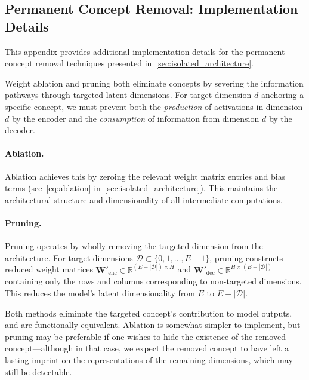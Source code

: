 \subsection{Permanent Concept Removal: Implementation Details}
\label{sec:permanent_removal_details}

This appendix provides additional implementation details for the permanent concept removal techniques presented in~\cref{sec:isolated_architecture}.

Weight ablation and pruning both eliminate concepts by severing the information pathways through targeted latent dimensions. For target dimension $d$ anchoring a specific concept, we must prevent both the \textit{production} of activations in dimension $d$ by the encoder and the \textit{consumption} of information from dimension $d$ by the decoder.

\paragraph{Ablation.}
Ablation achieves this by zeroing the relevant weight matrix entries and bias terms (see~\cref{eq:ablation} in~\cref{sec:isolated_architecture}). This maintains the architectural structure and dimensionality of all intermediate computations.

\paragraph{Pruning.}
Pruning operates by wholly removing the targeted dimension from the architecture. For target dimensions $\mathcal{D} \subset \{0, 1, \ldots, E-1\}$, pruning constructs reduced weight matrices $\mathbf{W}'_{\text{enc}} \in \mathbb{R}^{(E-|\mathcal{D}|) \times H}$ and $\mathbf{W}'_{\text{dec}} \in \mathbb{R}^{H \times (E-|\mathcal{D}|)}$ containing only the rows and columns corresponding to non-targeted dimensions. This reduces the model's latent dimensionality from $E$ to $E - |\mathcal{D}|$.

Both methods eliminate the targeted concept's contribution to model outputs, and are functionally equivalent. Ablation is somewhat simpler to implement, but pruning may be preferable if one wishes to hide the existence of the removed concept---although in that case, we expect the removed concept to have left a lasting imprint on the representations of the remaining dimensions, which may still be detectable.
